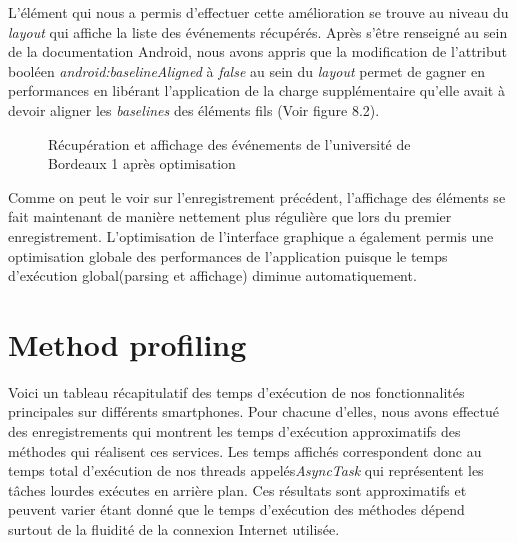L'élément qui nous a permis d'effectuer cette amélioration se trouve au niveau du \textit{layout} qui affiche la liste des événements récupérés. Après s'être renseigné au sein de la documentation Android, nous avons appris que la  modification de l'attribut booléen \textit{android:baselineAligned} à \textit{false} au sein du \textit{layout} permet de gagner en performances en libérant l'application de la charge supplémentaire qu'elle avait à devoir aligner les \textit{baselines} des éléments fils (Voir figure 8.2).

\begin{figure}[h!]
  \label{fig:systrace_optim}
  \center
  \setlength\fboxsep{5pt}
  \setlength\fboxrule{0.5pt}
  \caption{Récupération et affichage des événements de l'université de Bordeaux 1 après optimisation}
\end{figure}

Comme on peut le voir sur l'enregistrement précédent, l'affichage des éléments se fait maintenant de manière nettement plus régulière que lors du premier enregistrement. L'optimisation de l'interface graphique a également permis une optimisation globale des performances de l'application puisque le temps d'exécution global(parsing et affichage) diminue automatiquement. 

\section{Method profiling}
Voici un tableau récapitulatif des temps d’exécution de nos fonctionnalités principales sur différents smartphones. Pour chacune d'elles, nous avons effectué des enregistrements qui montrent les temps d'exécution approximatifs des méthodes qui réalisent ces services. Les temps affichés correspondent donc au temps total d'exécution de nos threads appelés\textit{AsyncTask} qui représentent les tâches lourdes exécutes en arrière plan. Ces résultats sont approximatifs et peuvent varier étant donné que le temps d’exécution des méthodes dépend surtout de la fluidité de la connexion Internet utilisée.\\


